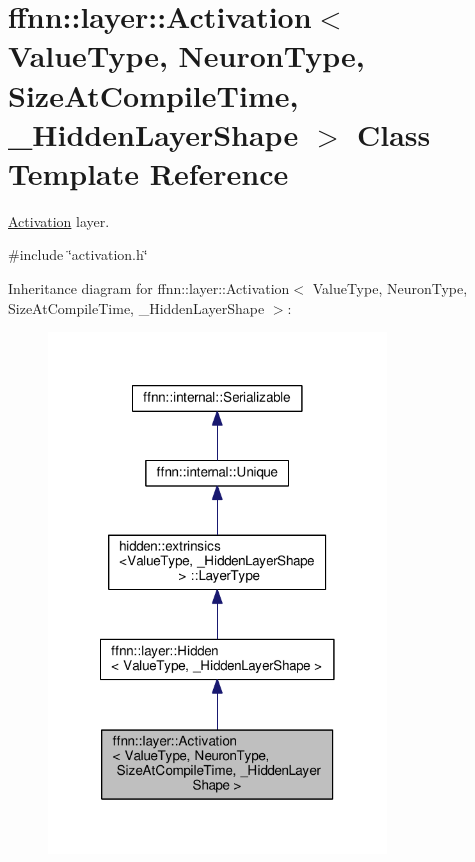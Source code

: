 \hypertarget{classffnn_1_1layer_1_1_activation}{\section{ffnn\-:\-:layer\-:\-:Activation$<$ Value\-Type, Neuron\-Type, Size\-At\-Compile\-Time, \-\_\-\-Hidden\-Layer\-Shape $>$ Class Template Reference}
\label{classffnn_1_1layer_1_1_activation}
}


\hyperlink{classffnn_1_1layer_1_1_activation}{Activation} layer.  




{\ttfamily \#include \char`\"{}activation.\-h\char`\"{}}



Inheritance diagram for ffnn\-:\-:layer\-:\-:Activation$<$ Value\-Type, Neuron\-Type, Size\-At\-Compile\-Time, \-\_\-\-Hidden\-Layer\-Shape $>$\-:\nopagebreak
\begin{figure}[H]
\begin{center}
\leavevmode
\includegraphics[width=254pt]{classffnn_1_1layer_1_1_activation__inherit__graph}
\end{center}
\end{figure}


